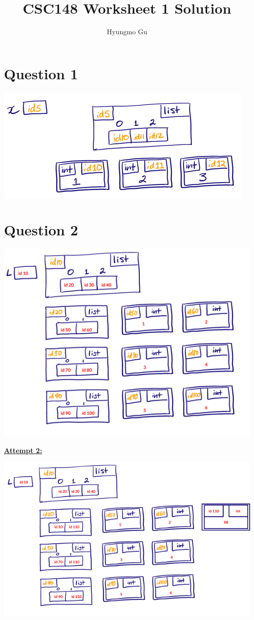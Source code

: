 \documentclass[12pt]{article}
\begin{document}
\title{CSC148 Worksheet 1 Solution}
\author{Hyungmo Gu}
\maketitle

\section*{Question 1}
\begin{center}
\includegraphics[width=0.5\linewidth]{images/worksheet_1_q1_solution.png}
\end{center}

\section*{Question 2}
\begin{center}
\includegraphics[width=0.5\linewidth]{images/worksheet_1_q2_solution.png}
\end{center}

\bigskip

\begin{mdframed}
    \underline{\textbf{Attempt 2:}}

    \bigskip

    \begin{center}
    \includegraphics[width=0.8\linewidth]{images/worksheet_1_q2_correction.png}
    \end{center}

\end{mdframed}
\end{document}
